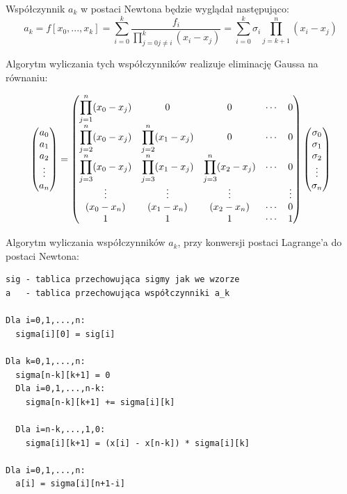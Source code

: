 \documentclass[a4paper]{article}
\begin{document}
Współczynnik $a_k$ w postaci Newtona będzie wyglądał następująco:
$$ a_k = f[x_0, ..., x_k] = \sum_{i=0}^k\frac{f_i}{\displaystyle\prod_{j=0 j \neq i}^k(x_i - x_j)} = 
\sum_{i=0}^{k}\sigma_i \prod_{j=k+1}^{n}(x_i - x_j)$$

Algorytm wyliczania tych współczynników realizuje eliminację Gaussa na równaniu:

$$
\begin{pmatrix}
  a_0 \\ a_1 \\ a_2 \\ \vdots \\ a_n
\end{pmatrix} = 
\begin{pmatrix} \displaystyle
  \displaystyle\prod_{j=1}^n(x_0 - x_j) & 0 & 0 & \cdots & 0 \\
  \displaystyle\prod_{j=2}^n(x_0 - x_j) & \displaystyle\prod_{j=2}^n(x_1 - x_j) & 0 & \cdots & 0\\
  \displaystyle\prod_{j=3}^n(x_0 - x_j) & \displaystyle\prod_{j=3}^n(x_1 - x_j) & \displaystyle\prod_{j=3}^n(x_2 - x_j) & \cdots & 0\\
  \vdots & \vdots & \vdots & & \vdots \\
  (x_0 - x_n) & (x_1 - x_n) & (x_2 - x_n) & \cdots & 0\\
  1 & 1 & 1 & \cdots & 1
\end{pmatrix}
\begin{pmatrix}
  \sigma_0\\
  \sigma_1\\
  \sigma_2\\
  \vdots\\
  \sigma_n\\
\end{pmatrix}
$$

Algorytm wyliczania współczynników $a_k$, przy konwersji postaci Lagrange'a do 
postaci Newtona:

\begin{verbatim}
sig - tablica przechowująca sigmy jak we wzorze
a   - tablica przechowująca współczynniki a_k

Dla i=0,1,...,n:
  sigma[i][0] = sig[i]

Dla k=0,1,...,n:
  sigma[n-k][k+1] = 0
  Dla i=0,1,...,n-k:
    sigma[n-k][k+1] += sigma[i][k]

  Dla i=n-k,...,1,0:
    sigma[i][k+1] = (x[i] - x[n-k]) * sigma[i][k]

Dla i=0,1,...,n:
  a[i] = sigma[i][n+1-i]
\end{verbatim}
\end{document}
